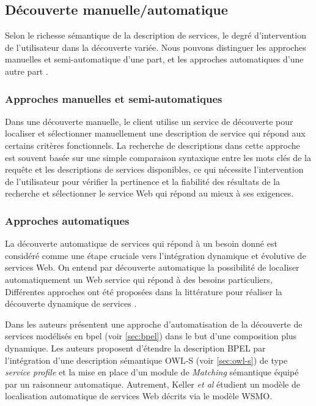   \subsection{Découverte manuelle/automatique}
  \label{sec:ws-desc:manual-vs-auto}
  Selon le richesse sémantique de la description de services, le
  degré d'intervention de l'utilisateur dans la découverte
  variée. Nous pouvons distinguer les approches manuelles et
  semi-automatique d'une part, et les approches automatiques d'une
  autre part \cite{elie2010,garofalakis2004web}.

    \subsubsection{Approches manuelles et semi-automatiques}
    Dans une découverte manuelle, le client utilise un service de
    découverte pour localiser et sélectionner manuellement une
    description de service qui répond aux certains critères
    fonctionnels. La recherche de descriptions dans cette approche est
    souvent basée sur une simple comparaison syntaxique entre les mots
    clés de la requête et les descriptions de services disponibles, ce
    qui nécessite l'intervention de l'utilisateur pour vérifier la
    pertinence et la fiabilité des résultats de la recherche et
    sélectionner le service Web qui répond au mieux à ses exigences.

    \subsubsection{Approches automatiques}
    La découverte automatique de services qui répond à un besoin donné
    est considéré comme une étape cruciale vers l'intégration
    dynamique et évolutive de services Web. On entend par découverte
    automatique la possibilité de localiser automatiquement un Web
    service qui répond à des besoins particuliers, Différentes
    approches ont été proposées dans la littérature pour réaliser la
    découverte dynamique de services \cite{paolucci2002semantic,
      bernstein2002discovering, mandell2003bottom,
      benatallah2005automating,keller2005automatic}.

    Dans \cite{mandell2003bottom} les auteurs présentent une approche
    d'automatisation de la découverte de services modélisés en
    \acrshort{bpel} (voir \ref{sec:bpel}) dans le but d'une
    composition plus dynamique. Les auteurs proposent d'étendre la
    description \textsc{BPEL} par l'intégration d'une description
    sémantique \textsc{OWL-S} (voir \ref{sec:owl-s}) de type
    \textit{service profile} et la mise en place d'un module de
    \textit{Matching} sémantique équipé par un raisonneur
    automatique. Autrement, Keller \textit{et al}
    \cite{keller2005automatic} étudient un modèle de localisation
    automatique de services Web décrits via le modèle \textsc{WSMO}.

